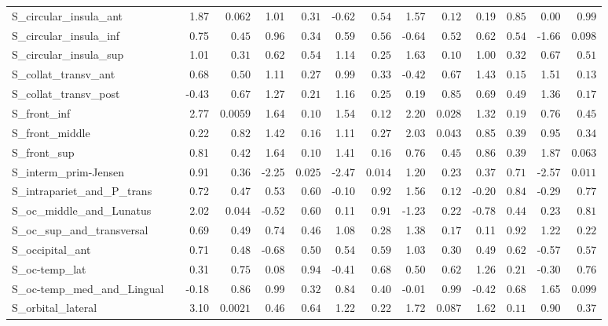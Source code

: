 {\begin{longtable}{llrrrrrrrrrrrr}
S\_circular\_insula\_ant &  & 1.87 & $0.062$ & 1.01 & $0.31$ & -0.62 & $0.54$ & 1.57 & $0.12$ & 0.19 & $0.85$ & 0.00 & $0.99$ \\
S\_circular\_insula\_inf &  & 0.75 & $0.45$ & 0.96 & $0.34$ & 0.59 & $0.56$ & -0.64 & $0.52$ & 0.62 & $0.54$ & -1.66 & $0.098$ \\
S\_circular\_insula\_sup &  & 1.01 & $0.31$ & 0.62 & $0.54$ & 1.14 & $0.25$ & 1.63 & $0.10$ & 1.00 & $0.32$ & 0.67 & $0.51$ \\
S\_collat\_transv\_ant &  & 0.68 & $0.50$ & 1.11 & $0.27$ & 0.99 & $0.33$ & -0.42 & $0.67$ & 1.43 & $0.15$ & 1.51 & $0.13$ \\
S\_collat\_transv\_post &  & -0.43 & $0.67$ & 1.27 & $0.21$ & 1.16 & $0.25$ & 0.19 & $0.85$ & 0.69 & $0.49$ & 1.36 & $0.17$ \\
S\_front\_inf &  & 2.77 & $0.0059$ & 1.64 & $0.10$ & 1.54 & $0.12$ & 2.20 & $0.028$ & 1.32 & $0.19$ & 0.76 & $0.45$ \\
S\_front\_middle &  & 0.22 & $0.82$ & 1.42 & $0.16$ & 1.11 & $0.27$ & 2.03 & $0.043$ & 0.85 & $0.39$ & 0.95 & $0.34$ \\
S\_front\_sup &  & 0.81 & $0.42$ & 1.64 & $0.10$ & 1.41 & $0.16$ & 0.76 & $0.45$ & 0.86 & $0.39$ & 1.87 & $0.063$ \\
S\_interm\_prim-Jensen &  & 0.91 & $0.36$ & -2.25 & $0.025$ & -2.47 & $0.014$ & 1.20 & $0.23$ & 0.37 & $0.71$ & -2.57 & $0.011$ \\
S\_intrapariet\_and\_P\_trans &  & 0.72 & $0.47$ & 0.53 & $0.60$ & -0.10 & $0.92$ & 1.56 & $0.12$ & -0.20 & $0.84$ & -0.29 & $0.77$ \\
S\_oc\_middle\_and\_Lunatus &  & 2.02 & $0.044$ & -0.52 & $0.60$ & 0.11 & $0.91$ & -1.23 & $0.22$ & -0.78 & $0.44$ & 0.23 & $0.81$ \\
S\_oc\_sup\_and\_transversal &  & 0.69 & $0.49$ & 0.74 & $0.46$ & 1.08 & $0.28$ & 1.38 & $0.17$ & 0.11 & $0.92$ & 1.22 & $0.22$ \\
S\_occipital\_ant &  & 0.71 & $0.48$ & -0.68 & $0.50$ & 0.54 & $0.59$ & 1.03 & $0.30$ & 0.49 & $0.62$ & -0.57 & $0.57$ \\
S\_oc-temp\_lat &  & 0.31 & $0.75$ & 0.08 & $0.94$ & -0.41 & $0.68$ & 0.50 & $0.62$ & 1.26 & $0.21$ & -0.30 & $0.76$ \\
S\_oc-temp\_med\_and\_Lingual &  & -0.18 & $0.86$ & 0.99 & $0.32$ & 0.84 & $0.40$ & -0.01 & $0.99$ & -0.42 & $0.68$ & 1.65 & $0.099$ \\
S\_orbital\_lateral &  & 3.10 & $0.0021$ & 0.46 & $0.64$ & 1.22 & $0.22$ & 1.72 & $0.087$ & 1.62 & $0.11$ & 0.90 & $0.37$ \\

\end{longtable}}

